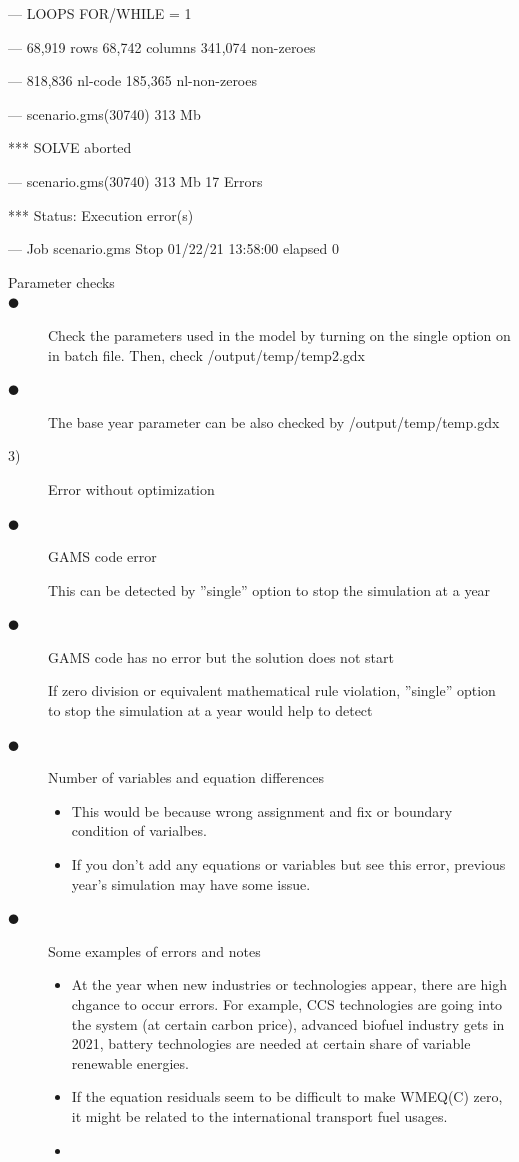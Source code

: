 \documentclass[10pt,a4paper,titlepage,dvipdfmx]{book}
\begin{document}
--- LOOPS FOR/WHILE = 1

---   68,919 rows  68,742 columns  341,074 non-zeroes

---   818,836 nl-code  185,365 nl-non-zeroes

--- scenario.gms(30740) 313 Mb

*** SOLVE aborted

--- scenario.gms(30740) 313 Mb 17 Errors

*** Status: Execution error(s)

--- Job scenario.gms Stop 01/22/21 13:58:00 elapsed 0
\begin{description}
\item[Parameter checks]
\item[${\CIRCLE}$]Check the parameters used in the model by turning on the single option on in batch file. Then, check /output/temp/temp2.gdx
\item[${\CIRCLE}$]The base year parameter can be also checked by /output/temp/temp.gdx
\end{description}

\begin{description}
\item[3)]Error without optimization
\item[${\CIRCLE}$]GAMS code error

This can be detected by ''single'' option to stop the simulation at a year
\item[${\CIRCLE}$]GAMS code has no error but the solution does not start

If zero division or equivalent mathematical rule violation, ''single'' option to stop the simulation at a year would help to detect
\item[${\CIRCLE}$]Number of variables and equation differences
\begin{itemize}
\item This would be because wrong assignment and fix or boundary condition of varialbes.
\item If you don't add any equations or variables but see this error, previous year's simulation may have some issue.
\end{itemize}

\item[${\CIRCLE}$]Some examples of errors and notes
\begin{itemize}
\item At the year when new industries or technologies appear, there are high chgance to occur errors. For example, CCS technologies are going into the system (at certain carbon price), advanced biofuel industry gets in 2021, battery technologies are needed at certain share of variable renewable energies.
\item If the equation residuals seem to be difficult to make WMEQ(C) zero, it might be related to the international transport fuel usages.
\item 
\end{itemize}

\end{description}
\end{document}
